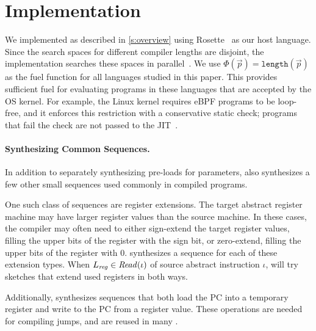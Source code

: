 \section{Implementation}\label{s:impl}
We implemented \jitsynth as described in \autoref{s:overview} using
Rosette~\cite{torlak:rosette} as our host language.
Since the search spaces for different compiler lengths are disjoint,
the \jitsynth implementation searches these spaces in parallel~\cite{bornholt:synapse}.
%
%
We use $\Phi(\vec{p}) = \texttt{length}(\vec{p})$ as the fuel function for all
languages studied in this paper. This provides sufficient fuel for evaluating
programs in these languages that are accepted by the OS kernel. For example, the
Linux kernel requires eBPF programs to be loop-free, and it enforces this
restriction with a conservative static check; programs that fail the check are
not passed to the JIT~\cite{gershuni:crab-ebpf}.

\paragraph{Synthesizing Common Sequences.}
In addition to separately synthesizing pre-loads for parameters,
\jitsynth also synthesizes a few other small sequences used commonly in compiled programs.

One such class of sequences are register extensions.
The target abstract register machine may have larger register values than the source machine.
In these cases, the compiler may often need to either sign-extend the target register values,
filling the upper bits of the register with the sign bit,
or zero-extend, filling the upper bits of the register with 0.
\jitsynth synthesizes a sequence for each of these extension types.
When $L_\mathit{reg}\in\mathit{Read}(\iota)$ of source abstract instruction $\iota$,
\jitsynth will try sketches that extend used registers in both ways.

Additionally, \jitsynth synthesizes sequences
that both load the PC into a temporary register
and write to the PC from a register value.
These operations are needed for compiling jumps,
and are reused in many \minicompilers.

